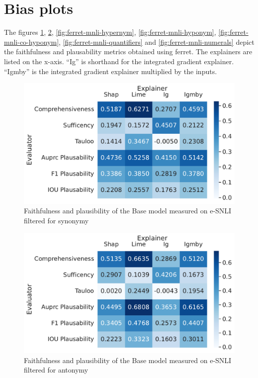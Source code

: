 \section{Bias plots} \label{sec:bias_plots}

The figures \ref{fig:ferret-mnli-synonym}, \ref{fig:ferret-mnli-antonym}, \ref{fig:ferret-mnli-hypernym}, \ref{fig:ferret-mnli-hyponym}, \ref{fig:ferret-mnli-co-hyponym}, \ref{fig:ferret-mnli-quantifiers} and \ref{fig:ferret-mnli-numerals} depict the faithfulness and plausability metrics obtained using ferret. The explainers are listed on the x-axis. \enquote{Ig} is shorthand for the integrated gradient explainer. \enquote{Igmby} is the integrated gradient explainer multiplied by the inputs.

\begin{figure}[h!]
    \centering
    \includegraphics[width=\textwidth]{./images/ferret_heatmaps_phenomena/default_mnli/synonym.pdf}
    \caption{Faithfulness and plausibility of the Base model measured on \acs{e-SNLI} filtered for synonymy}
    \label{fig:ferret-mnli-synonym}
\end{figure}

\begin{figure}[h!]
    \centering
    \includegraphics[width=\textwidth]{./images/ferret_heatmaps_phenomena/default_mnli/antonym.pdf}
    \caption{Faithfulness and plausibility of the Base model measured on \acs{e-SNLI} filtered for antonymy}
    \label{fig:ferret-mnli-antonym}
\end{figure}

